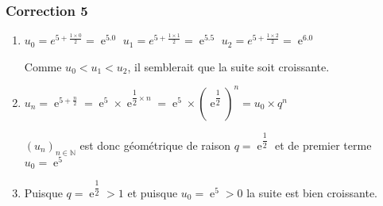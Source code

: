 \documentclass[15pt, mathserif]{beamer}
\DeclareMathOperator{\e}{e}
\newcommand{\N}{\mathbb{N}}			%
\newcommand{\st}[1]{$(#1_n)_{n \in \N}$}
\begin{document}
\begin{frame}
\vspace{-10mm}
	\frametitle{Correction 5}

 \begin{enumerate} 
 	 \item  \hfil$u_0=e^{5+\frac{1\times 0}{2}}=\e^{5.0}$ \hfil$u_1=e^{5+\frac{1\times 1}{2}}=\e^{5.5} $ \hfil $u_2=e^{5+\frac{1\times 2}{2}}=\e^{6.0}$
 
 Comme $u_0<u_1<u_2$, il semblerait que la suite soit croissante.
 	 \item $u_n=\e^{5+\frac{n}{2}}=\e^{5} \times \e^{\dfrac{1}{2}\times n} =\e^{5} \times \left( \e^{\dfrac{1}{2}} \right)^n=u_0 \times q^n$ 
 
 \st{u} est donc géométrique de raison $q= \e^{\dfrac{1}{2}}$ et de premier terme $u_0=\e^{5}$ 
 	 \item Puisque $q= \e^{\dfrac{1}{2}}>1$ et puisque $u_0=\e^{5}>0$ la suite est bien croissante.
 \end{enumerate}\end{frame}
\end{document}
